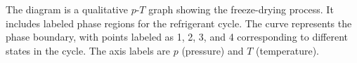 The diagram is a qualitative \( p \)-\( T \) graph showing the freeze-drying process. It includes labeled phase regions for the refrigerant cycle. The curve represents the phase boundary, with points labeled as 1, 2, 3, and 4 corresponding to different states in the cycle. The axis labels are \( p \) (pressure) and \( T \) (temperature).